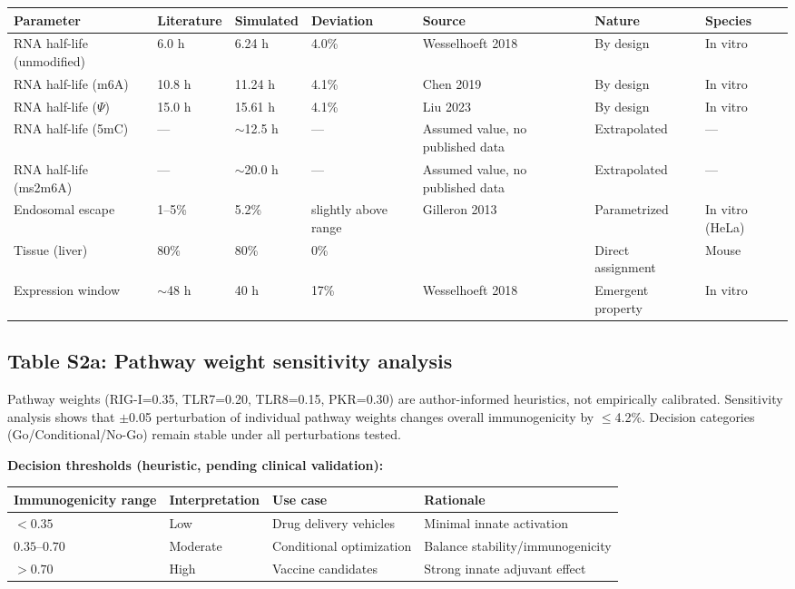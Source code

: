 \begin{tabular}{lllllll}
\toprule
\textbf{Parameter} & \textbf{Literature} & \textbf{Simulated} & \textbf{Deviation} & \textbf{Source} & \textbf{Nature} & \textbf{Species} \\
\midrule
RNA half-life (unmodified) & 6.0 h & 6.24 h & 4.0\% & Wesselhoeft 2018 & By design & In vitro \\
RNA half-life (m6A) & 10.8 h & 11.24 h & 4.1\% & Chen 2019 & By design & In vitro \\
RNA half-life ($\Psi$) & 15.0 h & 15.61 h & 4.1\% & Liu 2023 & By design & In vitro \\
RNA half-life (5mC) & --- & $\sim$12.5 h & --- & Assumed value, no published data & Extrapolated & --- \\
RNA half-life (ms2m6A) & --- & $\sim$20.0 h & --- & Assumed value, no published data & Extrapolated & --- \\
Endosomal escape & 1--5\% & 5.2\% & slightly above range & Gilleron 2013 & Parametrized & In vitro (HeLa) \\
Tissue (liver) & 80\% & 80\% & 0\% & \citep{paunovska2018} & Direct assignment & Mouse \\
Expression window & $\sim$48 h & 40 h & 17\% & Wesselhoeft 2018 & Emergent property & In vitro \\
\bottomrule
\end{tabular}

\subsection*{Table S2a: Pathway weight sensitivity analysis}

\small Pathway weights (RIG-I=0.35, TLR7=0.20, TLR8=0.15, PKR=0.30) are author-informed heuristics, not empirically calibrated. Sensitivity analysis shows that $\pm$0.05 perturbation of individual pathway weights changes overall immunogenicity by $\leq$4.2\%. Decision categories (Go/Conditional/No-Go) remain stable under all perturbations tested.

\textbf{Decision thresholds (heuristic, pending clinical validation):}

\begin{tabular}{llll}
\toprule
\textbf{Immunogenicity range} & \textbf{Interpretation} & \textbf{Use case} & \textbf{Rationale} \\
\midrule
$<0.35$ & Low & Drug delivery vehicles & Minimal innate activation \\
$0.35$--$0.70$ & Moderate & Conditional optimization & Balance stability/immunogenicity \\
$>0.70$ & High & Vaccine candidates & Strong innate adjuvant effect \\
\bottomrule
\end{tabular}

